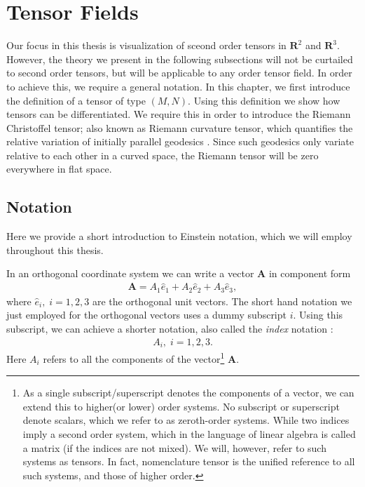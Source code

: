 \documentclass[main.tex]{subfiles}
\begin{document}
\section{Tensor Fields}
\label{sec:2}
Our focus in this thesis is visualization of sceond order tensors in $\mathbf{R}^2$ and
$\mathbf{R}^3$. However, the theory we present in the following subsections will not 
be curtailed to second order tensors, but will be applicable to any order tensor field. 
In order to achieve this, we require a general notation. In this chapter, we first introduce 
the definition of a tensor of type $(M,N)$. Using this definition we show how 
tensors can be differentiated. We require this in order to introduce the Riemann Christoffel 
tensor; also known as Riemann curvature tensor, which quantifies the relative variation
of initially parallel geodesics \cite{Moo10}. Since such geodesics only variate relative
to each other in a curved space, the Riemann tensor will be zero everywhere in flat space.

\subsection{Notation}
Here we provide a short introduction to Einstein notation, which we will employ throughout
this thesis.

In an orthogonal coordinate system we can write a vector $\mathbf{A}$ in component form
\begin{align*}
\mathbf{A} = A_1 \hat{e}_1 + A_2 \hat{e}_2 + A_3 \hat{e}_3,
\end{align*}
where $\hat{e}_i,\; i=1,2,3$ are the orthogonal unit vectors. The short hand notation we 
just employed for the orthogonal vectors uses a dummy subscript $i$. Using this subscript, 
we can achieve a shorter notation, also called the \emph{index} notation :
\begin{align*}
A_i, \;i = 1,2,3.
\end{align*}
Here $A_i$ refers to all the components of the vector\footnote{As a single subscript/superscript 
denotes the components of a vector, we can extend this to higher(or lower) order systems. 
No subscript or superscript denote scalars, which we refer to as zeroth-order systems. While 
two indices imply a second order system, which in the language of linear algebra is called a 
matrix (if the indices are not mixed). We will, however, refer to such systems as tensors. 
In fact, nomenclature tensor is the unified reference to all such systems, and those of higher order.}
$\mathbf{A}$. 
\end{document}
